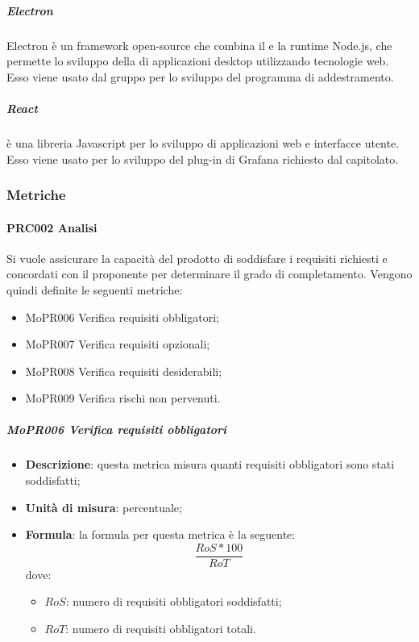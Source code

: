 \documentclass[../norme-di-progetto.tex]{subfiles}
\begin{document}
\subparagraph{Electron}
Electron è un framework open-source che combina il   e la runtime Node.js, che permette lo sviluppo della  di applicazioni desktop utilizzando tecnologie web. Esso viene usato dal gruppo per lo sviluppo del programma di addestramento.

\subparagraph{React}
 è una libreria Javascript per lo sviluppo di applicazioni web e interfacce utente. Esso viene usato per lo sviluppo del plug-in di Grafana richiesto dal capitolato.

\subsubsection{Metriche}
\paragraph{PRC002 Analisi}
Si vuole assicurare la capacità del prodotto di soddisfare i requisiti richiesti e concordati con il proponente per determinare il grado di completamento. Vengono quindi definite le seguenti metriche:
\begin{itemize}
  \item MoPR006 Verifica requisiti obbligatori;
  \item MoPR007 Verifica requisiti opzionali;
  \item MoPR008 Verifica requisiti desiderabili;
  \item MoPR009 Verifica rischi non pervenuti.
\end{itemize}
\subparagraph{MoPR006 Verifica requisiti obbligatori}
\begin{itemize}
  \item \textbf{Descrizione}: questa metrica misura quanti requisiti obbligatori sono stati soddisfatti;
  \item \textbf{Unità di misura}: percentuale;
  \item \textbf{Formula}: la formula per questa metrica è la seguente:
  \begin{displaymath}
    \frac{RoS * 100}{RoT}
  \end{displaymath}
  dove:
  \begin{itemize}
    \item $ RoS $: numero di requisiti obbligatori soddisfatti;
    \item $ RoT $: numero di requisiti obbligatori totali.
  \end{itemize}
\end{itemize}
\end{document}
